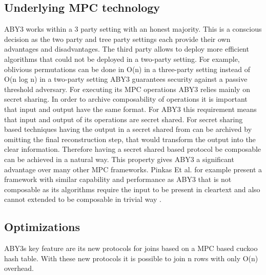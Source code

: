 \subsection{Underlying MPC technology}
ABY3 works within a 3 party setting with an honest majority. This is a conscious decision as the two party and tree party settings each provide their own advantages and disadvantages.
The third party allows to deploy more efficient algorithms that could not be deployed in a two-party setting. For example, oblivious permutations can be done in O(n) in a three-party setting instead of O(n log n) in a two-party setting \cite{mohassel2020fast}
 ABY3 guarantees security against a passive threshold adversary. For executing its MPC operations ABY3 relies mainly on secret sharing. In order to archive composability of operations it is important that input and output have the same format. For ABY3 this requirement means that input and output of its operations are secret shared. For secret sharing based techniques having the output in a secret shared from can be archived by omitting the final  reconstruction step, that would transform the output into the clear information. Therefore having a secret shared based protocol be composable can be achieved in a natural way. This property gives ABY3 a significant advantage over many other MPC frameworks. Pinkas Et al. \cite{pinkas2014faster} for example present a framework with similar capability and performance as ABY3 that is not composable as its algorithms require the input to be present in cleartext and also cannot extended to be composable in trivial way \cite{mohassel2020fast}.      
  

\subsection{Optimizations}
ABY3s key feature are its new protocols for joins based on a MPC based cuckoo hash table. With these new protocols it is possible to join n rows with only O(n) overhead.
